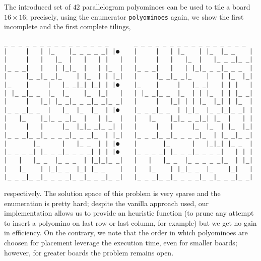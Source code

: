 \begin{example}
The introduced set of $42$ parallelogram polyominoes can be used to tile a
board $16\times 16$; precisely, using the enumerator \verb|polyominoes| again,
we show the first incomplete and the first complete tilings,
\iffalse
\begin{verbatim}
>>> size = 16
>>> dim = (size, size)
>>> polys_sols = polyominoes(dim, parallelogram_polyominoes,
...                          availables="ones",
...                          max_depth_reached=40,
...                          pruning=functools.partial(not_insertion_on_edges, size=size))
>>> pretty_tilings = pretty(polys_sols, dim, parallelogram_polyominoes, raw_text=True)
>>> print(next(pretty_tilings))
\end{verbatim}
\fi
\begin{Verbatim}[baselinestretch=0.1, fontsize=\small]
 _ _ _ _ _ _ _ _ _ _ _ _ _ _ _       _ _ _ _ _ _ _ _ _ _ _ _ _ _ _ _
|     |   | |_    |_ _ _ _ _| |●    |     |   | |_    | |_  |_ _    |
|     |   |   |_  |   |   | |   |   |     |   |   |_  |   |_ _ _|_ _|
|_ _ _|   |   | |_|_  |   | |_  |   |_ _ _|   |   | |_|_ _ _|_ _ _  |
|     |_ _|_ _|_    | |_  | | |_|   |     |_ _|_ _|_    |   | |_  |_|
|_    |     |   |_ _|_| |_| | |●    |_    |     |   |_ _|   | | |   |
| |_ _|_ _  |_  |_    |_  |_|   |   | |_ _|_ _  |_  | | |_  | | |_ _|
|     |   |_| |_ _|_ _ _|_ _|_ _|   |     |   |_| | | |_  |_| | |_  |
|_ _ _|_ _  |   |_  |_  |_  | |●    |_ _ _|_ _  | |_|_  |_ _|_|_ _| |
|   |_    |_|_ _ _|_  |   | |_  |   |   |_    |_|_ _ _|_| |_  |   | |
|     |   |     |_  |_|_ _|_ _| |   |     |   |     |_  |_  | |_  |_|
|_ _ _|_ _|_ _ _ _|_ _ _|_  | |_|   |_ _ _|_ _|_ _ _ _|_  | |_ _|_ _|
|       |_      |   |_ _  | | |●    |       |_      |   |_|_| |_ _  |
|_ _ _ _| |_ _ _|_ _ _ _| | | |●    |_ _ _ _| |_ _ _|_ _ _ _|   | | |
|   |   |_ _  |_ _ _  | |_|_|_ _|   |   |   |_ _  |_ _ _ _ _|_  | |_|
|   |_    | |_|_ _  |_| |_ _    |   |   |_    | |_|_ _  |_    |_|   |
|_ _ _|_ _|_ _ _ _|_ _|_ _ _|_ _|   |_ _ _|_ _|_ _ _ _|_ _|_ _ _|_ _|
\end{Verbatim}
respectively. The solution space of this problem is very sparse and the
enumeration is pretty hard; despite the vanilla approach used, our
implementation allows us to provide an heuristic function (to prune any attempt
to insert a polyomino on last row or last column, for example) but we get no
gain in efficiency. On the contrary, we note that the order in which
polyominoes are choosen for placement leverage the execution time, even for
smaller boards; however, for greater boards the problem remains open.
\end{example}

